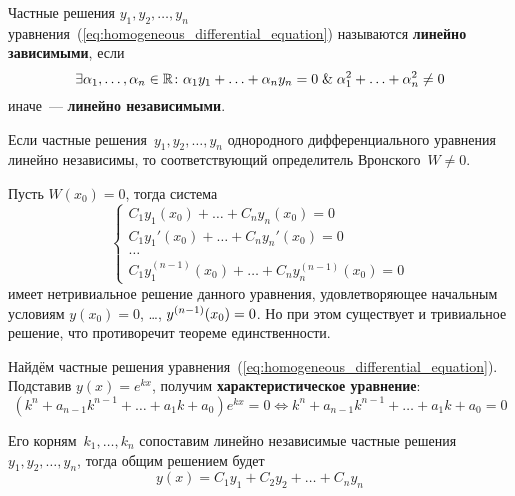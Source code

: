 Частные решения $y_1, y_2, \ldots, y_n$ уравнения~(\ref*{eq:homogeneous_differential_equation}) называются \textbf{линейно зависимыми}, если
\begin{equation*}
\exists \alpha_1, \ldots, \alpha_n \in \mathbb R \colon
\alpha_1 y_1 + \ldots + \alpha_n y_n = 0 \mathrel{\&}
\alpha_1^2 + \ldots + \alpha_n^2 \neq 0
\end{equation*}
иначе~--- \textbf{линейно независимыми}.

\begin{statement}
Если частные решения~$y_1, y_2, \ldots, y_n$ однородного дифференциального уравнения линейно независимы, то соответствующий определитель Вронского~$W \neq 0$.
\end{statement}
\begin{proofcontra}
Пусть $W(x_0) = 0$, тогда система
\begin{equation*}
\begin{cases}
C_1 y_1(x_0) + \ldots + C_n y_n(x_0) = 0 \\
C_1 y_1'(x_0) + \ldots + C_n y_n'(x_0) = 0 \\
\ldots \\
C_1 y_1^{(n-1)}(x_0) + \ldots + C_n y_n^{(n-1)}(x_0) = 0
\end{cases}
\end{equation*}
имеет нетривиальное решение данного уравнения, удовлетворяющее начальным условиям $y(x_0) = 0$, \ldots, $y^{(n-1)}(x_0) \opbr= 0$.
Но при этом существует и тривиальное решение, что противоречит теореме единственности.
\end{proofcontra}

 Найдём частные решения уравнения~(\ref*{eq:homogeneous_differential_equation}).
Подставив $y(x) = e^{kx}$, получим \textbf{характеристическое уравнение}:
\begin{equation*}
(k^n + a_{n-1} k^{n-1} + \ldots + a_1 k + a_0) e^{kx} = 0 \Leftrightarrow
k^n + a_{n-1} k^{n-1} + \ldots + a_1 k + a_0 = 0
\end{equation*}

Его корням~$k_1, \ldots, k_n$ сопоставим линейно независимые частные решения~$y_1, y_2, \ldots, y_n$, тогда общим решением будет
\begin{equation*}
y(x) = C_1 y_1 + C_2 y_2 + \ldots + C_n y_n
\end{equation*}

